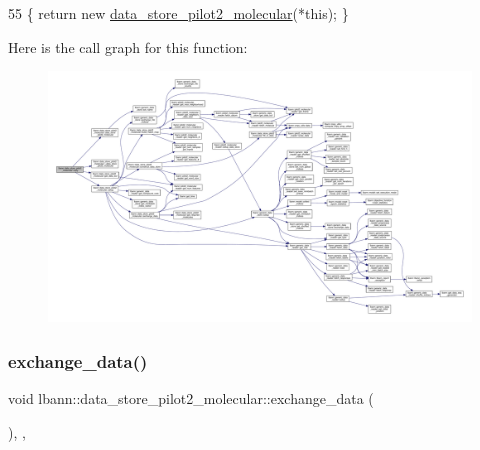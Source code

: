 \begin{DoxyCode}
55 \{ \textcolor{keywordflow}{return} \textcolor{keyword}{new} \hyperlink{classlbann_1_1data__store__pilot2__molecular_a125dd5e8628bb97608bd8e4a7b7428ef}{data\_store\_pilot2\_molecular}(*\textcolor{keyword}{this}); \}
\end{DoxyCode}
Here is the call graph for this function\+:\nopagebreak
\begin{figure}[H]
\begin{center}
\leavevmode
\includegraphics[width=350pt]{classlbann_1_1data__store__pilot2__molecular_a1a59e48a8c7ca8efe86509e0d9cd1307_cgraph}
\end{center}
\end{figure}
\mbox{\label{classlbann_1_1data__store__pilot2__molecular_addaa6db4e1b3a25424da9da63c0b3616}} 
\subsubsection{\texorpdfstring{exchange\+\_\+data()}{exchange\_data()}}
{\footnotesize\ttfamily void lbann\+::data\+\_\+store\+\_\+pilot2\+\_\+molecular\+::exchange\+\_\+data (\begin{DoxyParamCaption}{ }\end{DoxyParamCaption})\hspace{0.3cm}{\ttfamily [override]}, {\ttfamily [protected]}, {\ttfamily [virtual]}}



